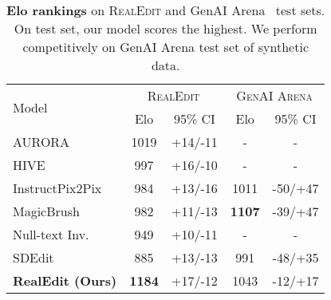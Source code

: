 \begin{table}[t]
    \centering
    \caption{\textbf{Elo rankings} on \textsc{RealEdit} and GenAI Arena~\cite{jiang2024genai} test sets. On \RealEdit test set, our model scores the highest. We perform competitively on GenAI Arena test set of synthetic data.}
    \label{tab:elo_rankings}
    \begin{tabular}{lcc | cc}
    \toprule
    \multirow{2}{*}{Model}& \multicolumn{2}{c|}{\textsc{RealEdit}} & \multicolumn{2}{c}{\textsc{GenAI Arena}} \\
    \cmidrule{2-5}
     & Elo & 95\% CI & Elo & 95\% CI \\
    \midrule
    AURORA~\cite{krojer2024learning} & 1019 & +14/-11 & - & - \\
    HIVE~\cite{zhang2024hive} & 997 & +16/-10 & - & - \\
    InstructPix2Pix~\cite{brooks2023instructpix2pix} & 984 & +13/-16 & 1011 & -50/+47 \\
    MagicBrush~\cite{zhang2024magicbrush} & 982 & +11/-13 & \textbf{1107} & -39/+47 \\
    Null-text Inv.~\cite{mokady2023null} & 949 & +10/-11 & - & - \\
    SDEdit~\cite{meng2021sdedit} & 885 & +13/-13 & 991 & -48/+35 \\
    \textbf{RealEdit (Ours)} & \textbf{1184} & +17/-12 &  1043 & -12/+17 \\
    \bottomrule
    \end{tabular}%
    \vspace{-0.1cm}
\end{table}
